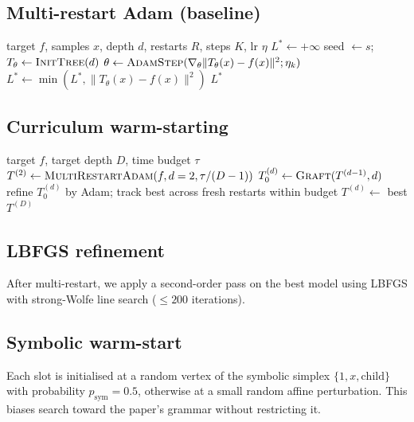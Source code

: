 \documentclass[11pt]{article}
\begin{document}
\subsection{Multi-restart Adam (baseline)}
\begin{algorithm}[h]
\caption{\textsc{MultiRestartAdam}}
\begin{algorithmic}[1]
\Require target $f$, samples $x$, depth $d$, restarts $R$, steps $K$, lr $\eta$
\State $L^* \gets +\infty$
  \State seed $\gets s$; \quad $T_\theta \gets \textsc{InitTree}(d)$
    \State $\theta \gets \textsc{AdamStep}(\nabla_\theta \|T_\theta(x)-f(x)\|^2; \eta_k)$
  \EndFor
  \State $L^* \gets \min(L^*, \|T_\theta(x)-f(x)\|^2)$
\EndFor
\State \Return $L^*$
\end{algorithmic}
\end{algorithm}

\subsection{Curriculum warm-starting}
\begin{algorithm}[h]
\caption{\textsc{Curriculum}}
\begin{algorithmic}[1]
\Require target $f$, target depth $D$, time budget $\tau$
\State $T^{(2)} \gets \textsc{MultiRestartAdam}(f, d=2, \tau/(D-1))$
  \State $T^{(d)}_0 \gets \textsc{Graft}(T^{(d-1)}, d)$ 
  \State refine $T^{(d)}_0$ by Adam; track best across fresh restarts within budget
  \State $T^{(d)} \gets$ best
\EndFor
\State \Return $T^{(D)}$
\end{algorithmic}
\end{algorithm}

\subsection{LBFGS refinement}
After multi-restart, we apply a second-order pass on the best model using
\textsc{LBFGS} with strong-Wolfe line search ($\leq 200$ iterations).

\subsection{Symbolic warm-start}
Each slot is initialised at a random vertex of the symbolic simplex $\{1, x,
\text{child}\}$ with probability $p_{\text{sym}} = 0.5$, otherwise at a small
random affine perturbation. This biases search toward the paper's grammar
without restricting it.
\end{document}
